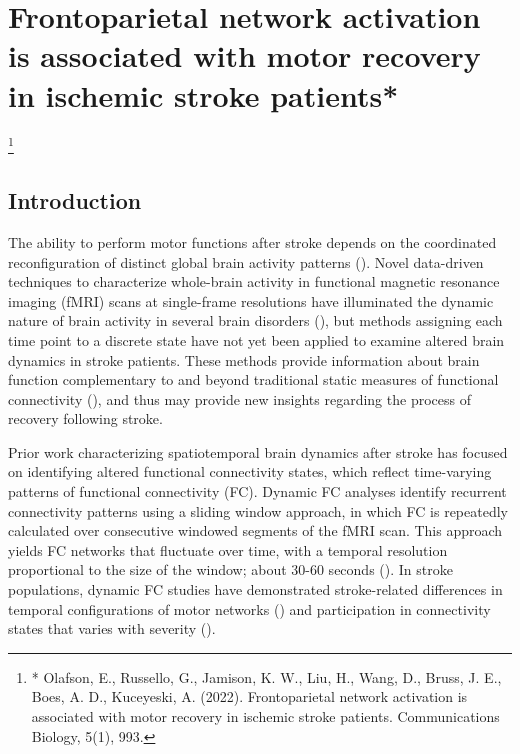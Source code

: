 \documentclass[phd,tocprelim]{cornell}
\newcommand\blfootnote[1]{%
  \begingroup
  \renewcommand\thefootnote{}\footnote{#1}%
  \addtocounter{footnote}{-1}%
  \endgroup
}
\begin{document}
\label{chap:1}

\chapter{Frontoparietal network activation is associated with motor recovery in ischemic stroke patients*}
\blfootnote{* Olafson, E., Russello, G., Jamison, K. W., Liu, H., Wang, D., Bruss, J. E., Boes, A. D.,  Kuceyeski, A. (2022). Frontoparietal network activation is associated with motor recovery in ischemic stroke patients. Communications Biology, 5(1), 993.}
\section{Introduction}
	The ability to perform motor functions after stroke depends on the coordinated reconfiguration of distinct global brain activity patterns (\cite{Park2011-kx}). Novel data-driven techniques to characterize whole-brain activity in functional magnetic resonance imaging (fMRI) scans at single-frame resolutions have illuminated the dynamic nature of brain activity in several brain disorders (\cite{ Braun2021-iy, Adhikari2020-tk, Kaiser2019-rf}), but methods assigning each time point to a discrete state have not yet been applied to examine altered brain dynamics in stroke patients. These methods provide information about brain function complementary to and beyond traditional static measures of functional connectivity (\cite{Cornblath2020-nc}), and thus may provide new insights regarding the process of recovery following stroke.
	
	Prior work characterizing spatiotemporal brain dynamics after stroke has focused on identifying altered functional connectivity states, which reflect time-varying patterns of functional connectivity (FC). Dynamic FC analyses identify recurrent connectivity patterns using a sliding window approach, in which FC is repeatedly calculated over consecutive windowed segments of the fMRI scan. This approach yields FC networks that fluctuate over time, with a temporal resolution proportional to the size of the window; about 30-60 seconds (\cite{Savva2019-hk}). In stroke populations, dynamic FC studies have demonstrated stroke-related differences in temporal configurations of motor networks (\cite{Bonkhoff2020-bx}) and participation in connectivity states that varies with severity (\cite{Bonkhoff2020-de}). 
	
\end{document}
